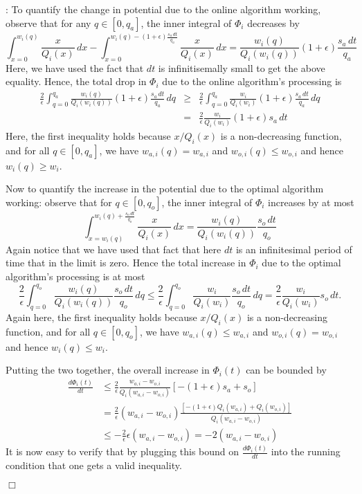 \documentclass[11pt]{article}
\newenvironment{proof}{\vspace{-0.15in}\noindent{\bf Proof:}}{\hspace*{\fill}$\Box$\par}
\newcommand{\const}{\frac{2}{\epsilon}}
\newcommand{\dphidt}{{\frac{d \Phi_i(t)}{dt}}}
\begin{document}
\begin{proof}
\medskip {}:
To quantify the change in potential due to the
online algorithm working, observe that for any $q \in [0, q_a]$, the
inner integral of $\Phi_i$ decreases by
\[
\int_{x= 0}^{w_i(q)} \frac{x}{Q_i(x)} \,dx - \int_{x= 0}^{w_i(q) -
  (1+\epsilon) \frac{s_a \,dt}{q_a}} \frac{x}{Q_i(x)} \,dx
= \frac{w_i(q)}{Q_i(w_i(q))} (1+\epsilon) \frac{s_a \,dt}{q_a}
\]
Here, we have used the fact that $dt$ is infinitisemally small to get the above equality. Hence, the total drop in $\Phi_i$ due to the online algorithm's
processing is
\begin{eqnarray*}
\const \int_{q = 0}^{q_a} \frac{w_i(q)}{Q_i(w_i(q))} (1+\epsilon) \frac{s_a
  \,dt}{q_a} \,dq  &\geq &
  \const \int_{q = 0}^{q_a} \frac{w_i}{Q_i(w_i)} (1+\epsilon) \frac{s_a
  \,dt}{q_a} \,dq\\
&=& \const \frac{w_i}{Q_i(w_i)} (1+\epsilon) s_a \,dt
\end{eqnarray*}
Here, the first inequality holds because $x/Q_i(x)$ is a non-decreasing function, and for all $q \in [0, q_a]$, we have $w_{a,i}(q) = w_{a,i}$ and $w_{o,i}(q) \leq w_{o,i}$ and hence $w_i(q) \geq w_i$.


Now to quantify the increase in the potential due to the optimal algorithm
working: observe that for $q \in [0, q_o]$, the inner integral of
$\Phi_i$ increases by at most
\[ \int_{x = w_{i}(q)}^{w_i(q) + \frac{s_o \,dt}{q_o} } \frac{x}{Q_i(x)}
\,dx = \frac{w_i(q)}{Q_i(w_i(q))} \frac{s_o \,dt}{q_o}
\]
Again notice that we have used that fact that here $dt$ is an infinitesimal period of time that in the limit is zero. Hence the total increase in $\Phi_i$ due to the optimal algorithm's processing
is at most
\[  \const \int_{q = 0}^{q_o} \frac{w_i(q)}{Q_i(w_i(q))} \frac{s_o \,dt}{q_o}
\,dq \leq
\const \int_{q = 0}^{q_o} \frac{w_i}{Q_i(w_i)} \frac{s_o \,dt}{q_o}
\,dq =  \const \frac{w_i}{Q_i(w_i)} s_o \,dt.
\]
Again here, the first inequality holds because $x/Q_i(x)$ is a non-decreasing function, and for all $q \in [0, q_o]$, we have $w_{a,i}(q) \leq w_{a,i}$ and $w_{o,i}(q) = w_{o,i}$ and hence $w_i(q) \leq w_i$.

Putting the two together, the overall increase in $\Phi_i(t)$ can be
bounded by
\begin{align*}
  \dphidt &\leq \const \frac{w_{a,i} - w_{o,i}}{Q_i(w_{a,i} - w_{o,i})}
  \left[ -(1+\epsilon) s_a + s_o \right] \\
  &= \const ( w_{a,i} - w_{o,i} ) \frac {[ -(1+\epsilon) Q_i(w_{a,i}) +
    Q_i(w_{o,i}) ]} {Q_i(w_{a,i} - w_{o,i})}  \\
  &\leq - \const \epsilon (w_{a,i} - w_{o,i}) = - 2 (w_{a,i} -
  w_{o,i}) \label{eq:phi}
\end{align*}
It is now easy to verify that by plugging this bound on $\dphidt$ into the
running condition that one gets a valid inequality.


\end{proof}
\end{document}
